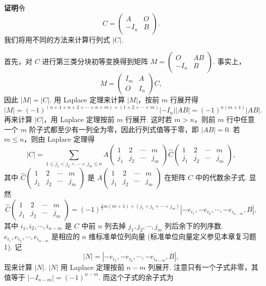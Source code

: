 \documentclass[UTF8,12pt,a4paper,fontset=fandol]{ctexart}
\begin{document}
\noindent\textbf{证明}\quad 令
\[
C=\left(\begin{array}{cc}
A & O\\
-I_n & B
\end{array}\right).
\]
我们将用不同的方法来计算行列式 $|C|$.

首先，对 $C$ 进行第三类分块初等变换得到矩阵 $M=\left(\begin{array}{cc}O&AB\\ -I_n&B\end{array}\right)$. 事实上，
\[
M=\left(\begin{array}{cc}
I_m & A\\
O & I_n
\end{array}\right)C,
\]
因此 $|M|=|C|$. 用 Laplace 定理来计算 $|M|$，按前 $m$ 行展开得
\[
|M|=(-1)^{(n+1+n+2+\cdots+n+m)+(1+2+\cdots+m)}|-I_n||AB|=(-1)^{n(m+1)}|AB|.
\]
再来计算 $|C|$，用 Laplace 定理按前 $m$ 行展开. 这时若 $m>n$，则前 $m$ 行中任意一个 $m$ 阶子式都至少有一列全为零，因此行列式值等于零，即 $|AB|=0$. 若 $m\leq n$，则由 Laplace 定理得
\[
|C|=\sum_{1\leq j_1<j_2<\cdots<j_m\leq n}
A\left(\begin{array}{cccc}
1 & 2 & \cdots & m\\
j_1 & j_2 & \cdots & j_m
\end{array}\right)
\widehat{C}\left(\begin{array}{cccc}
1 & 2 & \cdots & m\\
j_1 & j_2 & \cdots & j_m
\end{array}\right),
\]
其中 $\widehat{C}\left(\begin{array}{cccc}1&2&\cdots&m\\ j_1&j_2&\cdots&j_m\end{array}\right)$ 是 $A\left(\begin{array}{cccc}1&2&\cdots&m\\ j_1&j_2&\cdots&j_m\end{array}\right)$ 在矩阵 $C$ 中的代数余子式. 显然
\[
\widehat{C}\left(\begin{array}{cccc}
1 & 2 & \cdots & m\\
j_1 & j_2 & \cdots & j_m
\end{array}\right)
=(-1)^{\frac12 m(m+1)+(j_1+j_2+\cdots+j_m)}
|-e_{i_1},-e_{i_2},\cdots,-e_{i_{n-m}},B|,
\]
其中 $i_1,i_2,\cdots,i_{n-m}$ 是 $C$ 中前 $n$ 列去掉 $j_1,j_2,\cdots,j_m$ 列后余下的列序数. $e_{i_1},e_{i_2},\cdots,e_{i_{n-m}}$ 是相应的 $n$ 维标准单位列向量 (标准单位向量定义参见本章复习题 1). 记
\[
|N|=|-e_{i_1},-e_{i_2},\cdots,-e_{i_{n-m}},B|,
\]
现来计算 $|N|$. $|N|$ 用 Laplace 定理按前 $n-m$ 列展开. 注意只有一个子式非零，其值等于 $|-I_{n-m}|=(-1)^{n-m}$. 而这个子式的余子式为
\end{document}
